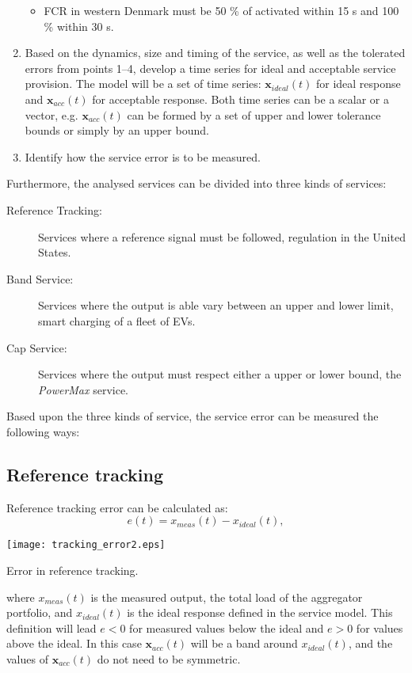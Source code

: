 \begin{enumerate}
\begin{itemize}
    \item \eg FCR in western Denmark must be 50 \% of activated within 15 s and 100 \% within 30 s.
  \end{itemize}
  \item Based on the dynamics, size and timing of the service, as well as the tolerated errors from points 1--4, develop a time series for ideal and acceptable service provision. The model will be a set of time series: $\mathbf{x}_{ideal}(t)$ for ideal response and $\mathbf{x}_{acc}(t)$ for acceptable response. Both time series can be a scalar or a vector, e.g. $\mathbf{x}_{acc}(t)$ can be formed by a set of upper and lower tolerance bounds or simply by an upper bound.
  \item Identify how the service error is to be measured.
\end{enumerate}

Furthermore, the analysed services can be divided into three kinds of services:
\begin{description}
	\item[Reference Tracking:] Services where a reference signal must be followed, \eg regulation in the United States.
	\item[Band Service:] Services where the output is able vary between an upper and lower limit, \eg smart charging of a fleet of EVs.
	\item[Cap Service:] Services where the output must respect either a upper or lower bound, \eg the \emph{PowerMax} service.
\end{description}

Based upon the three kinds of service, the service error can be measured the following ways:
\subsection*{Reference tracking}

Reference tracking error can be calculated as:
\begin{equation}\label{MAINeq:ref_error}
e(t) = x_{meas}(t) - x_{ideal}(t),
\end{equation}
\begin{marginfigure}
	\texttt{[image: tracking\_error2.eps]}
	\caption{Error in reference tracking.}
      \label{fig:reftrackerrorMAIN}
\end{marginfigure}
where $x_{meas}(t)$ is the measured output, \eg the total load of the aggregator portfolio, and $x_{ideal}(t)$ is the ideal response defined in the service model. This definition will lead $e<0$ for measured values below the ideal and $e>0$ for values above the ideal. In this case $\mathbf{x}_{acc}(t)$ will be a band around $x_{ideal}(t)$, and the values of $\mathbf{x}_{acc}(t)$ do not need to be symmetric.

